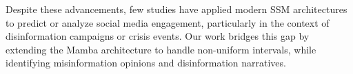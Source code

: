 Despite these advancements, few studies have applied modern SSM architectures to predict or analyze social media engagement, particularly in the context of disinformation campaigns or crisis events. 
Our work bridges this gap by extending the Mamba architecture to handle non-uniform intervals, while identifying misinformation opinions and disinformation narratives.





